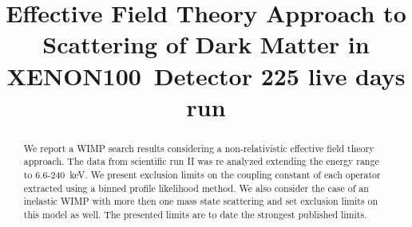 \documentclass[twocolumn, showpacs, showkeys, amsmath, amssymb, amsfonts, floatfix, linenumbers]{revtex4-1}
\newcommand{\Xehund}{{XENON100}}
\begin{document}

\title{Effective Field Theory Approach to Scattering of Dark Matter in  \Xehund\ Detector 225 live days run}
%


\begin{abstract} 

We report a WIMP search results considering a non-relativistic effective field theory approach.  The data from scientific run II was re analyzed extending the energy range to 6.6-240~keV. We present exclusion limits on the coupling constant of each operator extracted using a binned profile likelihood method. We also consider the case of an inelastic WIMP with more then one mass state scattering and set exclusion limits on this model as well. The presented limits are to date the strongest published limits. 
\end{abstract}

\pacs{}

\maketitle 












%


\end{document}
